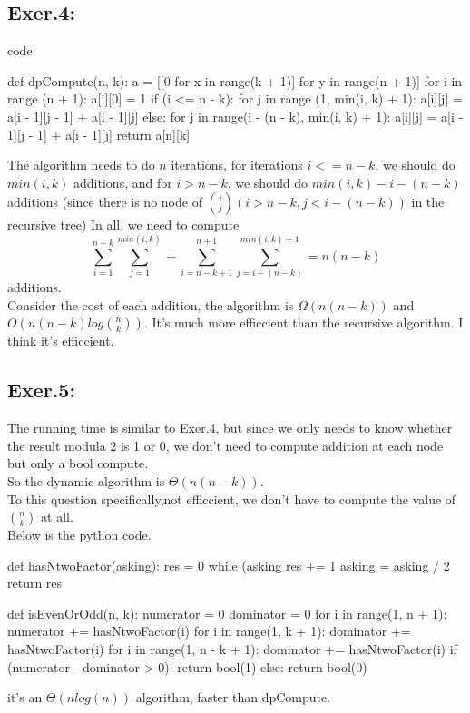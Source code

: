 \documentclass[UTF8]{ctexart}
\begin{document}
\subsection*{Exer.4:}
code:
\begin{python}
def dpCompute(n, k):
    a = [[0 for x in range(k + 1)] for y in range(n + 1)] 
    for i in range (n + 1):
        a[i][0] = 1
        if (i <= n - k):
            for j in range (1, min(i, k) + 1):
                a[i][j] = a[i - 1][j - 1] + a[i - 1][j]
        else:
            for j in range(i - (n - k), min(i, k) + 1):
                a[i][j] = a[i - 1][j - 1] + a[i - 1][j]
    return a[n][k]
\end{python}
The algorithm needs to do $n$ iterations, for iterations $i <= n - k$, 
we should do $min(i, k)$ additions, and for $i > n - k$, we should do $min(i, k) - i - (n - k)$ additions
(since there is no node of $\binom i j (i > n - k, j < i - (n - k))$ in the recursive tree)
In all, we need to compute
$$
    \sum_{i = 1}^{n - k} \sum_{j = 1}^{min(i, k)} + 
    \sum_{i = n - k + 1}^{n + 1}\sum_{j = i - (n - k)}^{min(i, k) + 1}
    = n (n - k)
$$
additions. \\
\hspace*{1em} Consider the cost of each addition, the algorithm is $\Omega(n(n - k))$ and $O(n(n - k) log \binom n k)$.
It's much more efficcient than the recursive algorithm. I think it's efficcient.


\subsection*{Exer.5:}
The running time is similar to Exer.4, but since we only needs to know whether the result modula 2 is 1 or 0,
we don't need to compute addition at each node but only a bool compute. \\
\hspace*{1em} So the dynamic algorithm is $\Theta (n(n - k))$.\\
\hspace*{1em} To this question specifically,not efficcient, 
we don't have to compute the value of $\binom n k$ at all.\\
Below is the python code.
\newpage
\begin{python}
def hasNtwoFactor(asking):
    res = 0
    while (asking %
        res += 1
        asking = asking / 2
    return res

def isEvenOrOdd(n, k):
    numerator = 0
    dominator = 0
    for i in range(1, n + 1):
        numerator += hasNtwoFactor(i)
    for i in range(1, k + 1):
        dominator += hasNtwoFactor(i)
    for i in range(1, n - k + 1):
        dominator += hasNtwoFactor(i)
    if (numerator - dominator > 0):
        return bool(1)
    else:
        return bool(0)
\end{python}
it's an $\Theta(n log(n))$ algorithm, faster than dpCompute.
\end{document}
